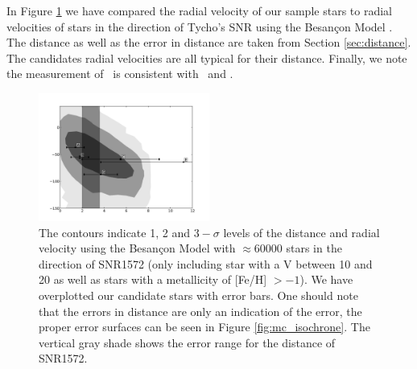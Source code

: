 In Figure \ref{fig:dist_vr} we have compared the radial velocity of our sample stars to radial velocities of stars in the direction of Tycho's SNR using the Besan\c{c}on Model \citep{2003A&A...409..523R}. The distance as well as the error in distance are taken from Section \ref{sec:distance}.  The candidates radial velocities are all typical for their distance. Finally, we note the measurement of \starg\ is consistent with \wek\ and \gh.


\begin{figure}[htbp] %
   \centering
   \includegraphics[width=0.5\textwidth]{chapter_sn1572_hires/plots/dist_vr.pdf} 
   \caption{The contours indicate 1, 2 and $3-\sigma$ levels of the distance and radial velocity using the Besan\c{c}on Model \citep{2003A&A...409..523R} with $\approx 60 000$ stars in the direction of SNR1572 (only including star with a V between 10 and 20 as well as stars with a metallicity of [Fe/H] $> -1$). We have overplotted our candidate stars with error bars. One should note that the errors in distance are only an indication of the error, the proper error surfaces can be seen in Figure \ref{fig:mc_isochrone}. The vertical gray shade shows the error range for the distance of SNR1572.}
   \label{fig:dist_vr}
\end{figure}



